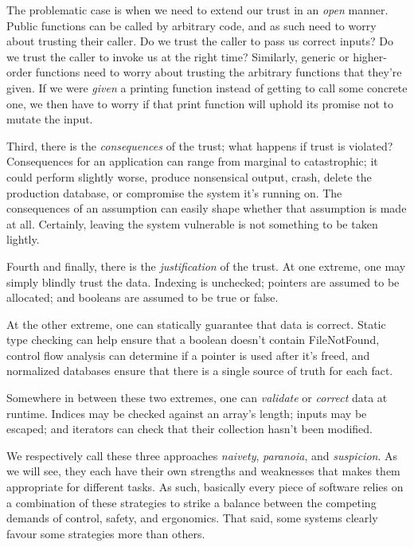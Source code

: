 The problematic case is when we need to extend our trust in an \emph{open} manner. Public
functions can be called by arbitrary code, and as such need to worry about trusting
their caller. Do we trust the caller to pass us correct inputs? Do we trust the caller
to invoke us at the right time? Similarly, generic or higher-order functions need to
worry about trusting the arbitrary functions that they're given. If we were \emph{given}
a printing function instead of getting to call some concrete
one, we then have to worry if that print function will uphold its promise not to mutate
the input.




Third, there is the \emph{consequences} of the trust; what happens if trust
is violated? Consequences for an application can range from marginal to catastrophic;
it could perform slightly worse, produce nonsensical output, crash, delete the
production database, or compromise the system it's running on.
The consequences of an assumption can easily shape whether that assumption is
made at all. Certainly, leaving the system vulnerable is not something to be
taken lightly.




Fourth and finally, there is the \emph{justification} of the trust. At one extreme, one may simply
blindly trust the data. Indexing is unchecked; pointers are assumed to be
allocated; and booleans are assumed to be true or false.

At the other extreme, one can statically guarantee that data is correct. Static
type checking can help ensure that a boolean doesn't contain FileNotFound,
control flow analysis can determine if a pointer is used after it's freed, and
normalized databases ensure that there is a single source of truth for each fact.

Somewhere in between these two extremes, one can \emph{validate} or \emph{correct} data
at runtime. Indices may be checked against an array's length; inputs may
be escaped; and iterators can check that their collection hasn't been modified.

We respectively call these three approaches \emph{naivety}, \emph{paranoia}, and \emph{suspicion}.
As we will see, they each have their own strengths and weaknesses that makes them appropriate
for different tasks. As such, basically every piece of software relies on a combination
of these strategies to strike a balance between the competing demands of control, safety,
and ergonomics. That said, some systems clearly favour some strategies more than others.



